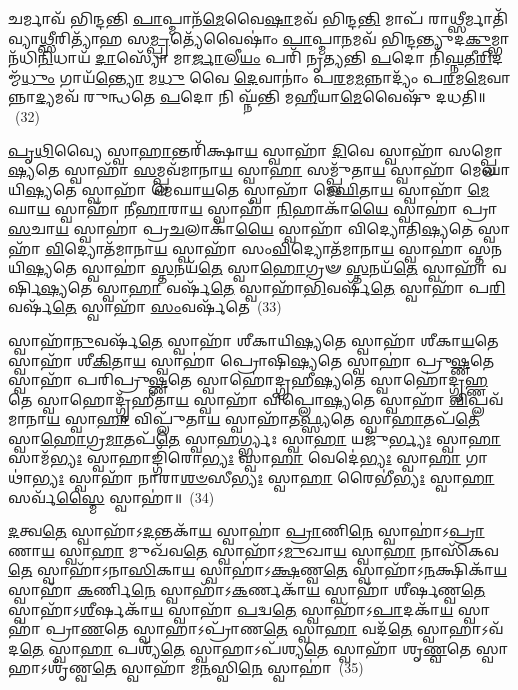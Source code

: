 𑌚𑌰𑍍𑌮𑌾𑌵᳴ 𑌭𑌿𑌨𑍍𑌦𑌨𑍍𑌤𑌿 \ul{𑌪𑌾}\-𑌪𑍍𑌮𑌾𑌨᳴\-\ul{𑌮𑍇}\-𑌵𑍈\-\ul{𑌷𑌾}\-𑌮𑌵᳴ 𑌭𑌿𑌨𑍍𑌦\-\ul{𑌨𑍍𑌤𑌿} 𑌮𑌾𑌪᳴ 𑌰𑌾\-\ul{𑌥𑍍𑌸𑍀}\-𑌰𑍍𑌮𑌾𑌤𑌿᳴ 𑌵𑍍𑌯𑌾\-\ul{𑌥𑍍𑌸𑍀}\-𑌰𑌿𑌤𑍍𑌯𑌾᳴𑌹 𑌸\-\ul{𑌮𑍍𑌪𑍍𑌰}\-𑌤𑍍𑌯𑍇᳴𑌵𑍈𑌷𑌾𑌂॑ \ul{𑌪𑌾}\-𑌪𑍍𑌮𑌾\-\ul{𑌨}\-𑌮𑌵᳴ 𑌭𑌿𑌨𑍍𑌦𑌨𑍍𑌤𑍍𑌯𑍁𑌦\-\ul{𑌕𑍁}\-𑌮𑍍𑌭𑌾𑌨᳴𑌧𑌿\-\ul{𑌨𑌿}\-𑌧𑌾𑌯᳴ \ul{𑌦𑌾}\-𑌸𑍍𑌯𑍋᳴ 𑌮𑌾\-\ul{𑌰𑍍𑌜𑌾}\-𑌲𑍀\-\ul{𑌯𑌂} 𑌪𑌰𑌿᳴ 𑌨𑍃𑌤𑍍𑌯𑌨𑍍𑌤𑌿 \ul{𑌪}\-𑌦𑍋 𑌨𑌿᳴\-\ul{𑌘𑍍𑌨}\-𑌤𑍀\-\ul{𑌰𑌿}\-𑌦𑌮𑍍𑌮᳴\-\ul{𑌧𑍁𑌂} 𑌗𑌾𑌯᳴\-\ul{𑌨𑍍𑌤𑍍𑌯𑍋} 𑌮\-\ul{𑌧𑍁} 𑌵𑍈 \ul{𑌦𑍇}\-𑌵𑌾𑌨𑌾𑌂॑ 𑌪\-\ul{𑌰}\-𑌮\-\ul{𑌮}\-𑌨𑍍𑌨𑌾𑌦𑍍𑌯𑌂᳴ 𑌪\-\ul{𑌰}\-𑌮\-\ul{𑌮𑍇}\-𑌵𑌾𑌨𑍍𑌨𑌾\-\ul{𑌦𑍍𑌯}\-𑌮𑌵᳴ 𑌰𑍁𑌨𑍍𑌧𑌤𑍇 \ul{𑌪}\-𑌦𑍋 𑌨𑌿 𑌘𑍍𑌨᳴𑌨𑍍𑌤𑌿 𑌮\-\ul{𑌹𑍀}\-𑌯𑌾\-\ul{𑌮𑍇}\-𑌵𑍈𑌷𑍁᳴ 𑌦𑌧𑌤𑌿॥~(32)

{\anuvakamend[{𑌚𑌰𑍍𑌮𑍈\-\ul{𑌕𑌾}\-𑌨𑍍𑌨𑌪᳴\-\ul{𑌞𑍍𑌚𑌾}\-𑌶𑌤𑍍}]}%

\-\ul{𑌪𑍃}\-\-\ul{𑌥𑌿}\-𑌵𑍍𑌯𑍈 𑌸𑍍𑌵𑌾\-\ul{𑌹𑌾}\-𑌨𑍍𑌤𑌰𑌿᳴𑌕𑍍𑌷𑌾\-\ul{𑌯} 𑌸𑍍𑌵𑌾𑌹𑌾᳴ \ul{𑌦𑌿}\-𑌵𑍇 𑌸𑍍𑌵𑌾𑌹𑌾᳴ 𑌸𑌮𑍍𑌪𑍍𑌲𑍋\-\ul{𑌷𑍍𑌯}\-𑌤𑍇 𑌸𑍍𑌵𑌾𑌹𑌾᳴ \ul{𑌸}\-𑌮𑍍𑌪𑍍𑌲𑌵᳴𑌮𑌾𑌨𑌾\-\ul{𑌯} 𑌸𑍍𑌵𑌾\-\ul{𑌹𑌾} 𑌸𑌮𑍍𑌪𑍍𑌲𑍁᳴𑌤𑌾\-\ul{𑌯} 𑌸𑍍𑌵𑌾𑌹𑌾᳴ 𑌮𑍇𑌘𑌾𑌯𑌿\-\ul{𑌷𑍍𑌯}\-𑌤𑍇 𑌸𑍍𑌵𑌾𑌹𑌾᳴ 𑌮𑍇𑌘𑌾\-\ul{𑌯}\-𑌤𑍇 𑌸𑍍𑌵𑌾𑌹𑌾᳴ 𑌮𑍇\-\ul{𑌘𑌿}\-𑌤𑌾\-\ul{𑌯} 𑌸𑍍𑌵𑌾𑌹𑌾᳴ \ul{𑌮𑍇}\-𑌘𑌾\-\ul{𑌯} 𑌸𑍍𑌵𑌾𑌹𑌾᳴ 𑌨𑍀\-\ul{𑌹𑌾}\-𑌰𑌾\-\ul{𑌯} 𑌸𑍍𑌵𑌾𑌹𑌾᳴ \ul{𑌨𑌿}\-𑌹𑌾𑌕𑌾᳴\-\ul{𑌯𑍈} 𑌸𑍍𑌵𑌾𑌹𑌾॑ 𑌪𑍍𑌰𑌾\-\ul{𑌸}\-𑌚𑌾\-\ul{𑌯} 𑌸𑍍𑌵𑌾𑌹𑌾॑ 𑌪𑍍𑌰\-\ul{𑌚}\-𑌲𑌾𑌕𑌾᳴\-\ul{𑌯𑍈} 𑌸𑍍𑌵𑌾𑌹𑌾᳴ 𑌵𑌿𑌦𑍍𑌯𑍋𑌤𑌿\-\ul{𑌷𑍍𑌯}\-𑌤𑍇 𑌸𑍍𑌵𑌾𑌹𑌾᳴ \ul{𑌵𑌿}\-𑌦𑍍𑌯𑍋𑌤᳴𑌮𑌾𑌨𑌾\-\ul{𑌯} 𑌸𑍍𑌵𑌾𑌹𑌾᳴ 𑌸𑌂\-\ul{𑌵𑌿}\-𑌦𑍍𑌯𑍋𑌤᳴𑌮𑌾𑌨𑌾\-\ul{𑌯} 𑌸𑍍𑌵𑌾𑌹𑌾॑ 𑌸𑍍𑌤𑌨𑌯𑌿\-\ul{𑌷𑍍𑌯}\-𑌤𑍇 𑌸𑍍𑌵𑌾𑌹𑌾॑ \ul{𑌸𑍍𑌤}\-𑌨𑌯᳴\-\ul{𑌤𑍇} 𑌸𑍍𑌵𑌾\-\ul{𑌹𑍋}\-𑌗𑍍𑌰𑍟 \ul{𑌸𑍍𑌤}\-𑌨𑌯᳴\-\ul{𑌤𑍇} 𑌸𑍍𑌵𑌾𑌹𑌾᳴ 𑌵𑌰𑍍\mbox{}𑌷𑌿\-\ul{𑌷𑍍𑌯}\-𑌤𑍇 𑌸𑍍𑌵𑌾\-\ul{𑌹𑌾} 𑌵𑌰𑍍\mbox{}𑌷᳴\-\ul{𑌤𑍇} 𑌸𑍍𑌵𑌾𑌹𑌾᳴\-\ul{𑌭𑌿}\-𑌵𑌰𑍍\mbox{}𑌷᳴\-\ul{𑌤𑍇} 𑌸𑍍𑌵𑌾𑌹𑌾᳴ 𑌪\-\ul{𑌰𑌿}\-𑌵𑌰𑍍\mbox{}𑌷᳴\-\ul{𑌤𑍇} 𑌸𑍍𑌵𑌾𑌹𑌾᳴ \ul{𑌸𑌂}\-𑌵𑌰𑍍\mbox{}𑌷᳴𑌤𑍇~(33)

𑌸𑍍𑌵𑌾𑌹𑌾᳴\-\ul{𑌨𑍁}\-𑌵𑌰𑍍\mbox{}𑌷᳴\-\ul{𑌤𑍇} 𑌸𑍍𑌵𑌾𑌹𑌾᳴ 𑌶𑍀𑌕𑌾𑌯𑌿\-\ul{𑌷𑍍𑌯}\-𑌤𑍇 𑌸𑍍𑌵𑌾𑌹𑌾᳴ 𑌶𑍀𑌕𑌾\-\ul{𑌯}\-𑌤𑍇 𑌸𑍍𑌵𑌾𑌹𑌾᳴ 𑌶𑍀\-\ul{𑌕𑌿}\-𑌤𑌾\-\ul{𑌯} 𑌸𑍍𑌵𑌾𑌹𑌾॑ 𑌪𑍍𑌰𑍋𑌷𑌿\-\ul{𑌷𑍍𑌯}\-𑌤𑍇 𑌸𑍍𑌵𑌾𑌹𑌾॑ 𑌪𑍍𑌰𑍁\-\ul{𑌷𑍍𑌣}\-𑌤𑍇 𑌸𑍍𑌵𑌾𑌹𑌾᳴ 𑌪𑌰𑌿𑌪𑍍𑌰𑍁\-\ul{𑌷𑍍𑌣}\-𑌤𑍇 𑌸𑍍𑌵𑌾𑌹𑍋॑𑌦𑍍𑌗𑍍𑌰𑌹𑍀\-\ul{𑌷𑍍𑌯}\-𑌤𑍇 𑌸𑍍𑌵𑌾𑌹𑍋॑𑌦𑍍𑌗𑍃\-\ul{𑌹𑍍𑌣}\-𑌤𑍇 𑌸𑍍𑌵𑌾𑌹𑍋𑌦𑍍𑌗𑍃᳴𑌹𑍀𑌤𑌾\-\ul{𑌯} 𑌸𑍍𑌵𑌾𑌹𑌾᳴ 𑌵𑌿𑌪𑍍𑌲𑍋\-\ul{𑌷𑍍𑌯}\-𑌤𑍇 𑌸𑍍𑌵𑌾𑌹𑌾᳴ \ul{𑌵𑌿}\-𑌪𑍍𑌲𑌵᳴𑌮𑌾𑌨𑌾\-\ul{𑌯} 𑌸𑍍𑌵𑌾\-\ul{𑌹𑌾} 𑌵𑌿𑌪𑍍𑌲𑍁᳴𑌤𑌾\-\ul{𑌯} 𑌸𑍍𑌵𑌾𑌹𑌾᳴𑌤\-\ul{𑌫𑍍𑌸𑍍𑌯}\-𑌤𑍇 𑌸𑍍𑌵𑌾\-\ul{𑌹𑌾}\-𑌤𑌪᳴\-\ul{𑌤𑍇} 𑌸𑍍𑌵𑌾\-\ul{𑌹𑍋}\-𑌗𑍍𑌰\-\ul{𑌮𑌾}\-𑌤𑌪᳴\-\ul{𑌤𑍇} 𑌸𑍍𑌵𑌾\-\ul{𑌹}\-𑌰𑍍𑌗𑍍𑌭𑍍𑌯𑌃 𑌸𑍍𑌵𑌾\-\ul{𑌹𑌾} 𑌯𑌜𑍁᳴\-\ul{𑌰𑍍𑌭𑍍𑌯𑌃} 𑌸𑍍𑌵𑌾\-\ul{𑌹𑌾} 𑌸𑌾𑌮᳴\-\ul{𑌭𑍍𑌯𑌃} 𑌸𑍍𑌵𑌾𑌹𑌾𑌙𑍍𑌗𑌿᳴𑌰𑍋\-\ul{𑌭𑍍𑌯𑌃} 𑌸𑍍𑌵𑌾\-\ul{𑌹𑌾} 𑌵𑍇𑌦𑍇॑\-\ul{𑌭𑍍𑌯𑌃} 𑌸𑍍𑌵𑌾\-\ul{𑌹𑌾} 𑌗𑌾𑌥𑌾॑\-\ul{𑌭𑍍𑌯𑌃} 𑌸𑍍𑌵𑌾𑌹𑌾᳴ 𑌨𑌾𑌰𑌾\-\ul{𑌶}\-\-\ul{𑍞}\-𑌸𑍀\-\ul{𑌭𑍍𑌯𑌃} 𑌸𑍍𑌵𑌾\-\ul{𑌹𑌾} 𑌰𑍈𑌭𑍀॑\-\ul{𑌭𑍍𑌯𑌃} 𑌸𑍍𑌵𑌾\-\ul{𑌹𑌾} 𑌸𑌰𑍍𑌵᳴\-\ul{𑌸𑍍𑌮𑍈} 𑌸𑍍𑌵𑌾𑌹𑌾॑॥~(34)

{\anuvakamend[{\-\ul{𑌸𑌂} 𑌵𑌰𑍍\mbox{}𑌷᳴\-\ul{𑌤𑍇} 𑌰𑍈𑌭𑍀॑\-\ul{𑌭𑍍𑌯𑌃} 𑌸𑍍𑌵𑌾\-\ul{𑌹𑌾} 𑌦𑍍𑌵𑍇 𑌚᳴}]}%

\-\ul{𑌦}\-𑌤𑍍𑌵\-\ul{𑌤𑍇} 𑌸𑍍𑌵𑌾𑌹𑌾᳴\-𑌽\-\ul{𑌦}\-𑌨𑍍𑌤𑌕𑌾᳴\-\ul{𑌯} 𑌸𑍍𑌵𑌾𑌹𑌾॑ \ul{𑌪𑍍𑌰𑌾}\-𑌣𑌿\-\ul{𑌨𑍇} 𑌸𑍍𑌵𑌾𑌹𑌾॑\-𑌽\-\ul{𑌪𑍍𑌰𑌾}\-𑌣𑌾\-\ul{𑌯} 𑌸𑍍𑌵𑌾\-\ul{𑌹𑌾} 𑌮𑍁𑌖᳴𑌵\-\ul{𑌤𑍇} 𑌸𑍍𑌵𑌾𑌹𑌾᳴\-𑌽\-\ul{𑌮𑍁}\-𑌖𑌾\-\ul{𑌯} 𑌸𑍍𑌵𑌾\-\ul{𑌹𑌾} 𑌨𑌾𑌸𑌿᳴𑌕𑌵\-\ul{𑌤𑍇} 𑌸𑍍𑌵𑌾𑌹𑌾᳴\-𑌽𑌨𑌾\-\ul{𑌸𑌿}\-𑌕𑌾\-\ul{𑌯} 𑌸𑍍𑌵𑌾𑌹𑌾॑\-𑌽\-\ul{𑌕𑍍𑌷}\-𑌣𑍍𑌵\-\ul{𑌤𑍇} 𑌸𑍍𑌵𑌾𑌹𑌾᳴\-𑌽\-\ul{𑌨}\-𑌕𑍍𑌷𑌿𑌕𑌾᳴\-\ul{𑌯} 𑌸𑍍𑌵𑌾𑌹𑌾᳴ \ul{𑌕}\-𑌰𑍍𑌣𑌿\-\ul{𑌨𑍇} 𑌸𑍍𑌵𑌾𑌹𑌾᳴\-𑌽\-\ul{𑌕}\-𑌰𑍍𑌣𑌕𑌾᳴\-\ul{𑌯} 𑌸𑍍𑌵𑌾𑌹𑌾᳴ 𑌶𑍀𑌰𑍍\mbox{}\-\ul{𑌷}\-𑌣𑍍𑌵\-\ul{𑌤𑍇} 𑌸𑍍𑌵𑌾𑌹𑌾᳴\-𑌽\-\-\ul{𑌶𑍀}\-𑌰𑍍\mbox{}𑌷𑌕𑌾᳴\-\ul{𑌯} 𑌸𑍍𑌵𑌾𑌹𑌾᳴ \ul{𑌪}\-𑌦𑍍𑌵\-\ul{𑌤𑍇} 𑌸𑍍𑌵𑌾𑌹𑌾᳴\-𑌽\-\ul{𑌪𑌾}\-𑌦𑌕𑌾᳴\-\ul{𑌯} 𑌸𑍍𑌵𑌾𑌹𑌾॑ 𑌪𑍍𑌰𑌾\-\ul{𑌣}\-𑌤𑍇 𑌸𑍍𑌵𑌾𑌹𑌾\-𑌽𑌪𑍍𑌰𑌾᳴𑌣\-\ul{𑌤𑍇} 𑌸𑍍𑌵𑌾\-\ul{𑌹𑌾} 𑌵𑌦᳴\-\ul{𑌤𑍇} 𑌸𑍍𑌵𑌾𑌹𑌾\-𑌽𑌵᳴𑌦\-\ul{𑌤𑍇} 𑌸𑍍𑌵𑌾\-\ul{𑌹𑌾} 𑌪𑌶𑍍𑌯᳴\-\ul{𑌤𑍇} 𑌸𑍍𑌵𑌾𑌹𑌾\-𑌽𑌪᳴𑌶𑍍𑌯\-\ul{𑌤𑍇} 𑌸𑍍𑌵𑌾𑌹𑌾᳴ 𑌶𑍃\-\ul{𑌣𑍍𑌵}\-𑌤𑍇 𑌸𑍍𑌵𑌾𑌹𑌾\-𑌽𑌶𑍃᳴𑌣𑍍𑌵\-\ul{𑌤𑍇} 𑌸𑍍𑌵𑌾𑌹𑌾᳴ 𑌮\-\ul{𑌨}\-𑌸𑍍𑌵𑌿\-\ul{𑌨𑍇} 𑌸𑍍𑌵𑌾𑌹𑌾॑~(35)


